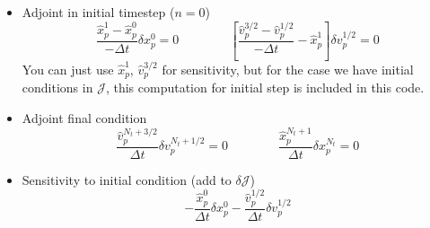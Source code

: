 \documentclass[11pt]{article}
\newcommand{\vp}{v_p}
\newcommand{\xp}{x_p}
\newcommand{\Dt}{\Delta t}
\newcommand{\vph}{\hat{v}_p}
\newcommand{\xph}{\hat{x}_p}
\newcommand{\cJ}{\mathcal{J}}
\begin{document}
\begin{itemize}
\item Adjoint in initial timestep ($n=0$)
\begin{equation}
\frac{\xph^1-\xph^0}{-\Dt}\delta \xp^0 = 0\qquad\qquad \left[ \frac{\vph^{3/2} - \vph^{1/2}}{-\Dt} - \xph^1 \right]\delta \vp^{1/2}=0
\end{equation}
You can just use $\xph^1$, $\vph^{3/2}$ for sensitivity,
but for the case we have initial conditions in $\cJ$, this computation for initial step is included in this code.
\item Adjoint final condition
\begin{equation}
\frac{\vph^{N_t+3/2}}{\Dt}\delta v_p^{N_t+1/2} = 0\qquad\qquad\frac{\xph^{N_t+1}}{\Dt}\delta x_p^{N_t} = 0
\end{equation}
\item Sensitivity to initial condition (add to $\delta \cJ$)
\begin{equation}
-\frac{\xph^0}{\Dt}\delta \xp^0 - \frac{\vph^{1/2}}{\Dt}\delta \vp^{1/2}
\end{equation}
\end{itemize}
\end{document}
